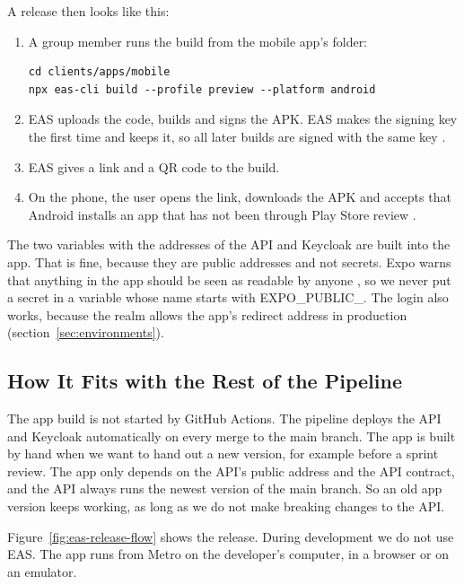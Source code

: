 \documentclass[a4paper,11pt]{article}
\begin{document}
A release then looks like this:
\begin{enumerate}
    \item A group member runs the build from the mobile app's folder:
\begin{lstlisting}
cd clients/apps/mobile
npx eas-cli build --profile preview --platform android
\end{lstlisting}
    \item EAS uploads the code, builds and signs the APK. EAS makes the signing key the first time and keeps it, so all later builds are signed with the same key \cite{expo-internal-distribution}.
    \item EAS gives a link and a QR code to the build.
    \item On the phone, the user opens the link, downloads the APK and accepts that Android installs an app that has not been through Play Store review \cite{expo-internal-distribution}.
\end{enumerate}


The two variables with the addresses of the API and Keycloak are built into the app. That is fine, because they are public addresses and not secrets. Expo warns that anything in the app should be seen as readable by anyone \cite{expo-environment-variables}, so we never put a secret in a variable whose name starts with EXPO\_PUBLIC\_. The login also works, because the realm allows the app's redirect address in production (section~\ref{sec:environments}).

\subsection{How It Fits with the Rest of the Pipeline}
The app build is not started by GitHub Actions. The pipeline deploys the API and Keycloak automatically on every merge to the main branch. The app is built by hand when we want to hand out a new version, for example before a sprint review. The app only depends on the API's public address and the API contract, and the API always runs the newest version of the main branch. So an old app version keeps working, as long as we do not make breaking changes to the API.

Figure~\ref{fig:eas-release-flow} shows the release. During development we do not use EAS. The app runs from Metro on the developer's computer, in a browser or on an emulator.
\end{document}
